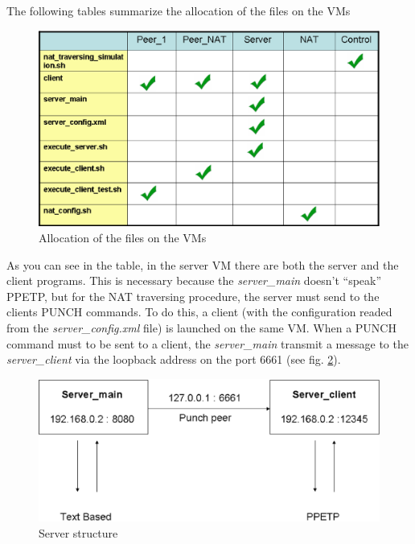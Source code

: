 The following tables summarize the allocation of the files on the VMs
\begin{figure}[htbp]
	\centering
		\includegraphics[scale=0.4]{files_table.eps}
	\caption[File allocation]{Allocation of the files on the VMs}	
	\label{fig:files_table}
\end{figure}
%
As you can see in the table, in the server VM there are both the server and the client programs. This is necessary because the \emph{server\_main} doesn't ``speak'' PPETP, but for the NAT traversing procedure, the server must send to the clients PUNCH commands. To do this, a client (with the configuration readed from the \emph{server\_config.xml} file) is launched on the same VM. When a PUNCH command must to be sent to a client, the \emph{server\_main} transmit a message to the \emph{server\_client} via the loopback address on the port 6661 (see fig.  \ref{fig:server_structure}).
%
\begin{figure}[htbp]
	\centering
		\includegraphics[scale=0.4]{server_structure.eps}
	\caption[Server structure]{Server structure}	
	\label{fig:server_structure}
\end{figure}
%
%
